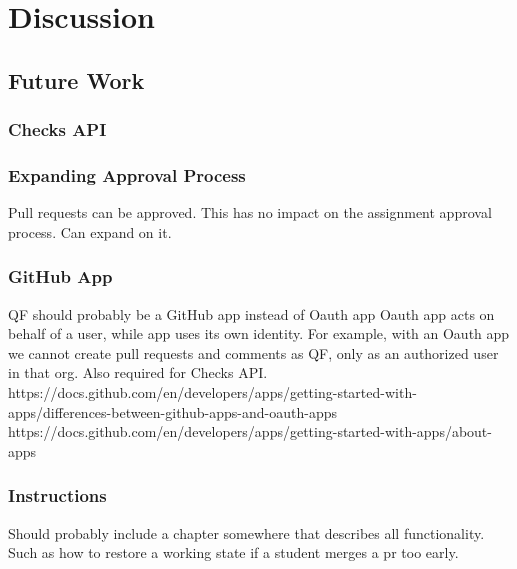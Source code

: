 
\chapter{Discussion}
\label{ch:discussion}

\section{Future Work}

\subsection{Checks API}

\subsection{Expanding Approval Process}
Pull requests can be approved. This has no impact on the assignment approval process. Can expand on it.

\subsection{GitHub App}
\label{section:github-app}

QF should probably be a GitHub app instead of Oauth app
Oauth app acts on behalf of a user, while app uses its own identity.
For example, with an Oauth app we cannot create pull requests and comments as QF, only as an authorized user in that org.
Also required for Checks API.
https://docs.github.com/en/developers/apps/getting-started-with-apps/differences-between-github-apps-and-oauth-apps
https://docs.github.com/en/developers/apps/getting-started-with-apps/about-apps

\subsection{Instructions}

Should probably include a chapter somewhere that describes all functionality.
Such as how to restore a working state if a student merges a pr too early.